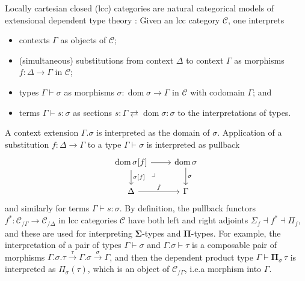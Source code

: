 \documentclass[a4paper]{article}
\theoremstyle{remark}
\theoremstyle{definition}
\begin{document}
Locally cartesian closed (lcc) categories are natural categorical models of extensional dependent type theory \citep{lcc-categories-and-type-theory}:
Given an lcc category $\mathcal{C}$, one interprets
\begin{itemize}
  \item
    contexts $\Gamma$ as objects of $\mathcal{C}$;
  \item
    (simultaneous) substitutions from context $\Delta$ to context $\Gamma$ as morphisms $f : \Delta \rightarrow \Gamma$ in $\mathcal{C}$;
  \item
    types $\Gamma \vdash \sigma$ as morphisms $\sigma : \operatorname{dom} \sigma \rightarrow \Gamma$ in $\mathcal{C}$ with codomain $\Gamma$; and
  \item
    terms $\Gamma \vdash s : \sigma$ as sections $s : \Gamma \rightleftarrows \operatorname{dom} \sigma : \sigma$ to the interpretations of types.
\end{itemize}
A context extension $\Gamma.\sigma$ is interpreted as the domain of $\sigma$.
Application of a substitution $f : \Delta \rightarrow \Gamma$ to a type $\Gamma \vdash \sigma$ is interpreted as pullback
\begin{equation}
  \begin{tikzcd}
    \operatorname{dom} \sigma[f] \arrow[r] \arrow[d, "{\sigma[f]}"] \arrow[dr, phantom, near start, "\lrcorner"] & \operatorname{dom} \sigma \arrow[d, "\sigma"] \\
    \Delta \arrow[r, "f"] & \Gamma
  \end{tikzcd}
\end{equation}
and similarly for terms $\Gamma \vdash s : \sigma$.
By definition, the pullback functors $f^* : \mathcal{C}_{/ \Gamma} \rightarrow \mathcal{C}_{/ \Delta}$ in lcc categories $\mathcal{C}$ have both left and right adjoints $\Sigma_f \dashv f^* \dashv \Pi_f$, and these are used for interpreting $\mathbf{\Sigma}$-types and $\mathbf{\Pi}$-types.
For example, the interpretation of a pair of types $\Gamma \vdash \sigma$ and $\Gamma.\sigma \vdash \tau$ is a composable pair of morphisms $\Gamma.\sigma.\tau \xrightarrow{\tau} \Gamma.\sigma \xrightarrow{\sigma} \Gamma$, and then the dependent product type $\Gamma \vdash \mathbf{\Pi}_\sigma \, \tau$ is interpreted as $\Pi_\sigma(\tau)$, which is an object of $\mathcal{C}_{/ \Gamma}$, i.e.\@ a morphism into $\Gamma$.
\end{document}
